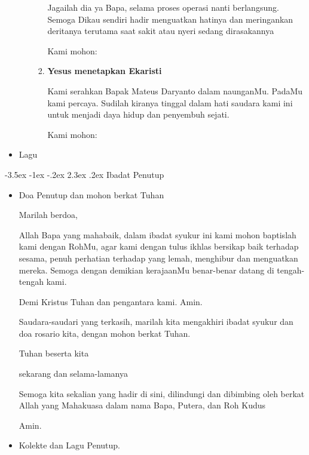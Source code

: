 \documentclass[a5paper,titlepage,12pt]{scrbook}
\makeatletter
\renewcommand{\section}{\@startsection {section}{1}{\z@}%
                                   {-3.5ex \@plus -1ex \@minus -.2ex}%
                                   {2.3ex \@plus.2ex}%
                                   {\normalfont\normalsize\bfseries}}
\makeatother
\begin{document}
\begin{itemize}
\begin{enumerate}[a.]
\begin{enumerate}[{Peristiwa }I.]
Jagailah dia ya Bapa, selama proses operasi nanti berlangsung. Semoga Dikau sendiri hadir menguatkan hatinya dan meringankan deritanya terutama saat sakit atau nyeri sedang dirasakannya			

Kami mohon:
			
			\item \textbf{Yesus menetapkan Ekaristi}

Kami serahkan Bapak Mateus Daryanto dalam naunganMu. PadaMu kami percaya. Sudilah kiranya tinggal dalam hati saudara kami ini untuk menjadi daya hidup dan penyembuh sejati.
			
Kami mohon:

		\end{enumerate}
	\end{enumerate}
	\item Lagu
\end{itemize}

\section{Ibadat Penutup}
\begin{itemize}
\item Doa Penutup dan mohon berkat Tuhan

	Marilah berdoa,

Allah Bapa yang mahabaik, dalam ibadat syukur ini kami mohon baptislah kami dengan RohMu, agar kami dengan tulus ikhlas bersikap baik terhadap sesama, penuh perhatian terhadap yang lemah, menghibur dan menguatkan mereka. Semoga dengan demikian kerajaanMu benar-benar datang di tengah-tengah kami.

Demi Kristus Tuhan dan pengantara kami. 
Amin.

Saudara-saudari yang terkasih, marilah kita mengakhiri ibadat syukur dan doa rosario kita, dengan mohon berkat Tuhan.

Tuhan beserta kita

sekarang dan selama-lamanya

Semoga kita sekalian yang hadir di sini, dilindungi dan dibimbing oleh berkat Allah yang Mahakuasa dalam nama Bapa, Putera, dan Roh Kudus

Amin.

\item Kolekte dan Lagu Penutup. 
\end{itemize}
\end{document}
